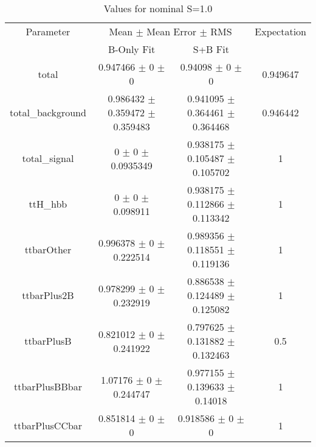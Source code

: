 \begin{table}
\centering
\caption{Values for nominal S=1.0}
\begin{tabular}{cccc}
\toprule
Parameter & \multicolumn{2}{c}{Mean $\pm$ Mean Error $\pm$ RMS} & Expectation\\
 & B-Only Fit & S+B Fit & \\
\midrule
total & \num{0.947466} $\pm$ \num{0} $\pm$ \num{0} & \num{0.94098} $\pm$ \num{0} $\pm$ \num{0} & \num{0.949647}\\
total\_background & \num{0.986432} $\pm$ \num{0.359472} $\pm$ \num{0.359483} & \num{0.941095} $\pm$ \num{0.364461} $\pm$ \num{0.364468} & \num{0.946442}\\
total\_signal & \num{0} $\pm$ \num{0} $\pm$ \num{0.0935349} & \num{0.938175} $\pm$ \num{0.105487} $\pm$ \num{0.105702} & \num{1}\\
ttH\_hbb & \num{0} $\pm$ \num{0} $\pm$ \num{0.098911} & \num{0.938175} $\pm$ \num{0.112866} $\pm$ \num{0.113342} & \num{1}\\
ttbarOther & \num{0.996378} $\pm$ \num{0} $\pm$ \num{0.222514} & \num{0.989356} $\pm$ \num{0.118551} $\pm$ \num{0.119136} & \num{1}\\
ttbarPlus2B & \num{0.978299} $\pm$ \num{0} $\pm$ \num{0.232919} & \num{0.886538} $\pm$ \num{0.124489} $\pm$ \num{0.125082} & \num{1}\\
ttbarPlusB & \num{0.821012} $\pm$ \num{0} $\pm$ \num{0.241922} & \num{0.797625} $\pm$ \num{0.131882} $\pm$ \num{0.132463} & \num{0.5}\\
ttbarPlusBBbar & \num{1.07176} $\pm$ \num{0} $\pm$ \num{0.244747} & \num{0.977155} $\pm$ \num{0.139633} $\pm$ \num{0.14018} & \num{1}\\
ttbarPlusCCbar & \num{0.851814} $\pm$ \num{0} $\pm$ \num{0} & \num{0.918586} $\pm$ \num{0} $\pm$ \num{0} & \num{1}\\
\bottomrule
\end{tabular}
\end{table}